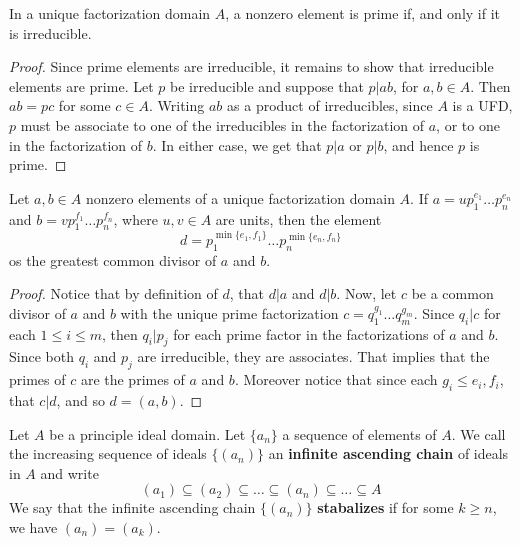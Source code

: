 \begin{lemma}\label{2.3.3}
    In a unique factorization domain $A$, a nonzero element is prime if, and
    only if it is irreducible.
\end{lemma}
\begin{proof}
    Since prime elements are irreducible, it remains to show that irreducible
    elements are prime. Let $p$ be irreducible and suppose that  $p|ab$, for
    $a,b \in A$. Then  $ab=pc$ for some  $c \in A$. Writing  $ab$ as a product
    of irreducibles, since  $A$ is a UFD,  $p$ must be associate to one of the
    irreducibles in the factorization of $a$, or to one in the factorization of
$b$. In either case, we get that $p|a$ or $p|b$, and hence  $p$ is prime.
\end{proof}

\begin{lemma}\label{2.3.4}
    Let $a,b \in A$ nonzero elements of a unique factorization domain $A$. If
    $a=up_1^{e_1} \dots p_n^{e_n}$ and $b=vp_1^{f_1} \dots p_n^{f_n}$, where
    $u,v \in A$ are units, then the element
    \begin{equation*}
        d=p_1^{\min\{e_1,f_1\}} \dots p_n^{\min\{e_n,f_n\}}
    \end{equation*}
    os the greatest common divisor of $a$ and  $b$.
\end{lemma}
\begin{proof}
    Notice that by definition of $d$, that  $d|a$ and  $d|b$. Now, let  $c$ be a
    common divisor of  $a$ and  $b$ with the unique prime factorization
    $c=q_1^{g_1} \dots q_m^{g_m}$. Since $q_i|c$ for each  $1 \leq i \leq m$,
    then  $q_i|p_j$ for each prime factor in the factorizations of  $a$ and
    $b$. Since both  $q_i$ and  $p_j$ are irreducible, they are associates. That
    implies that the primes of  $c$ are the primes of  $a$ and  $b$. Moreover
    notice that since each $g_i \leq e_i,f_i$, that  $c|d$, and so  $d=(a,b)$.
\end{proof}

\begin{definition}
    Let $A$ be a principle ideal domain. Let $\{a_n\}$ a sequence of elements of
    $A$. We call the increasing sequence of ideals  $\{(a_n)\}$ an
    \textbf{infinite ascending chain} of ideals in $A$ and write
    \begin{equation*}
        (a_1) \subseteq (a_2) \subseteq \dots \subseteq (a_n) \subseteq \dots
        \subseteq A
    \end{equation*}
    We say that the infinite ascending chain $\{(a_n)\}$ \textbf{stabalizes} if
    for some $k \geq n$, we have  $(a_n)=(a_k)$.
\end{definition}

